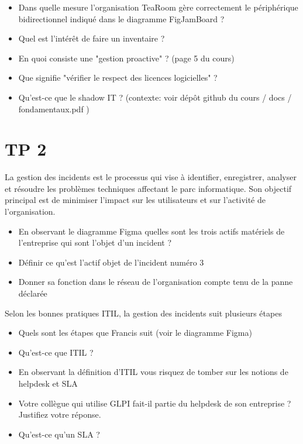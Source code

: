 \documentclass[12pt, letterpaper]{article}
\begin{document}
\begin{itemize}
    \item Dans quelle mesure l'organisation TeaRoom gère correctement le périphérique bidirectionnel indiqué dans le diagramme FigJamBoard ?
\end{itemize}


\begin{itemize}
    \item Quel est l'intérêt de faire un inventaire ?
    \item En quoi consiste une "gestion proactive" ? (page 5 du cours)
    \item Que signifie "vérifier le respect des licences logicielles" ?
    \item Qu'est-ce que le shadow IT ? (contexte: voir dépôt github du cours / docs / fondamentaux.pdf )
\end{itemize}


\section*{TP 2}

\begin{tcolorbox}[colback=cyan!5,colframe=cyan!60!black,title=Définition]
La gestion des incidents est le processus qui vise à identifier, enregistrer, analyser et résoudre les problèmes techniques affectant le parc informatique. Son objectif principal est de minimiser l’impact sur les utilisateurs et sur l’activité de l’organisation.
\end{tcolorbox}

\begin{itemize}
    \item En observant le diagramme Figma quelles sont les trois actifs matériels de l'entreprise qui sont l'objet d'un incident ?
    \item Définir ce qu'est l'actif objet de l'incident numéro 3
    \item Donner sa fonction dans le réseau de l'organisation compte tenu de la panne déclarée
\end{itemize}

\begin{tcolorbox}[colback=cyan!5,colframe=cyan!60!black,title=ITIL]
Selon les bonnes pratiques ITIL, la gestion des incidents suit plusieurs étapes 
\end{tcolorbox}

\begin{itemize}
    \item Quels sont les étapes que Francis suit (voir le diagramme Figma)
    \item Qu'est-ce que ITIL ?
    \item En observant la définition d'ITIL vous risquez de tomber sur les notions de helpdesk et SLA
    \item Votre collègue qui utilise GLPI fait-il partie du helpdesk de son entreprise ? Justifiez votre réponse.
    \item Qu'est-ce qu'un SLA ?
\end{itemize}
\end{document}
